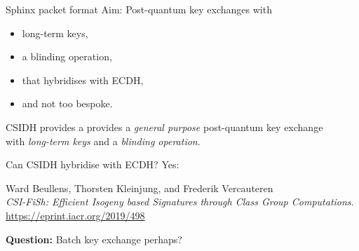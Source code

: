 \documentclass[fleqn,xcolor={usenames,dvipsnames},notes,aspectratio=169]{beamer} %
\begin{document}
\begin{frame}[t]{Sphinx packet format}
Aim: Post-quantum key exchanges with
\begin{itemize}
\item long-term keys, 
\item a blinding operation, 
\item that hybridises with ECDH,
\item and not too bespoke.
\end{itemize}


\bigskip
{}
\end{frame}


\begin{frame}[t]
CSIDH provides a provides a {\it general purpose} post-quantum key exchange \\
with {\it long-term keys} and a {\it blinding operation}.

\bigskip

Can CSIDH hybridise with ECDH?  \pause Yes: 

\medskip

Ward Beullens, Thorsten Kleinjung, and Frederik Vercauteren \\
{\it CSI-FiSh: Efficient Isogeny based Signatures through Class Group Computations}.  \url{https://eprint.iacr.org/2019/498}

\bigskip\bigskip\pause
{\bf Question:}  Batch key exchange perhaps?

\end{frame}
\end{document}
